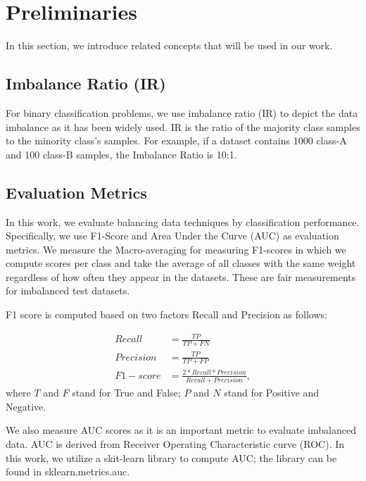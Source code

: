 \section{Preliminaries}
\label{sec:preliminaries}       
In this section, we introduce related concepts that will be used in our work. 

\subsection{Imbalance Ratio (IR)}
For binary classification problems, we use imbalance ratio (IR) to depict the data imbalance as it has been widely used. IR is the ratio of the majority class samples to the minority class's samples. For example, if a dataset contains 1000 class-A and 100 class-B samples, the Imbalance Ratio is 10:1.   

\subsection{Evaluation Metrics}
\label{f1score}
In this work, we evaluate balancing data techniques by classification performance. Specifically, we use F1-Score and Area Under the Curve (AUC) as evaluation metrics. We measure the Macro-averaging for measuring F1-scores in which we compute scores per class and take the average of all classes with the same weight regardless of how often they appear in the datasets. These are fair measurements for imbalanced test datasets. 

F1 score is computed based on two factors Recall and Precision as follows:

\begin{align}
Recall &= \frac{TP}{TP+FN}\\
Precision &= \frac{TP}{TP+FP}\\
F1-score &= \frac{2*Recall*Precision}{Recall+Precision},
\end{align}
where $T$ and $F$ stand for True and False; $P$ and $N$ stand for Positive and Negative. 

We also measure AUC \cite{cite:AUC} scores as it is an important metric to evaluate imbalanced data. AUC is derived from Receiver Operating Characteristic curve (ROC). In this work, we utilize a skit-learn library to compute AUC; the library can be found in sklearn.metrics.auc. 


